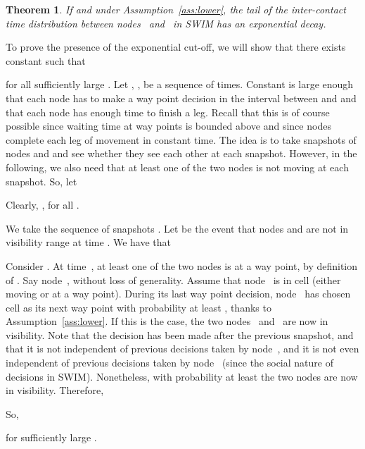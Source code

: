 \documentclass[conference]{IEEEtran}
\newtheorem{theorem}{Theorem}
\begin{document}
\begin{theorem}
If  and under Assumption~\ref{ass:lower}, \emph{the tail} of the
inter-contact time distribution between nodes~ and~ in SWIM has an
exponential decay.
\end{theorem}
\begin{IEEEproof}
To prove the presence of the exponential cut-off, we will show that there exists
constant  such that

for all sufficiently large . Let , , be
a sequence of times. Constant  is large enough that each node has
to make a way point decision in the interval between  and 
and that each node has enough time to finish a leg. Recall that this is of
course possible since waiting time at way points is bounded above and since
nodes complete each leg of movement in constant time. The idea is to take
snapshots of nodes  and  and see whether they see each other at each
snapshot. However, in the following, we also need that at least one of the two
nodes is not moving at each snapshot. So, let

Clearly, , for all .

We take the sequence of snapshots . Let  be the event that nodes  and  are not in visibility range at time . We have that

Consider . At
time~, at least one of the two nodes is at a way point, by
definition of . Say node~, without loss of generality. Assume that
node~ is in cell  (either moving or at a way point). During its last way
point decision, node~ has chosen cell  as its next way point with
probability at least , thanks to Assumption~\ref{ass:lower}. If
this is the case, the two nodes~ and~ are now in visibility. Note that the
decision has been made after the previous snapshot, and that it is not
independent of previous decisions taken by node~, and it is not even
independent of previous decisions taken by node~ (since the social nature of
decisions in SWIM). Nonetheless, with probability at least  the two
nodes are now in visibility. Therefore,

So,

for sufficiently large .
\end{IEEEproof}
\end{document}

